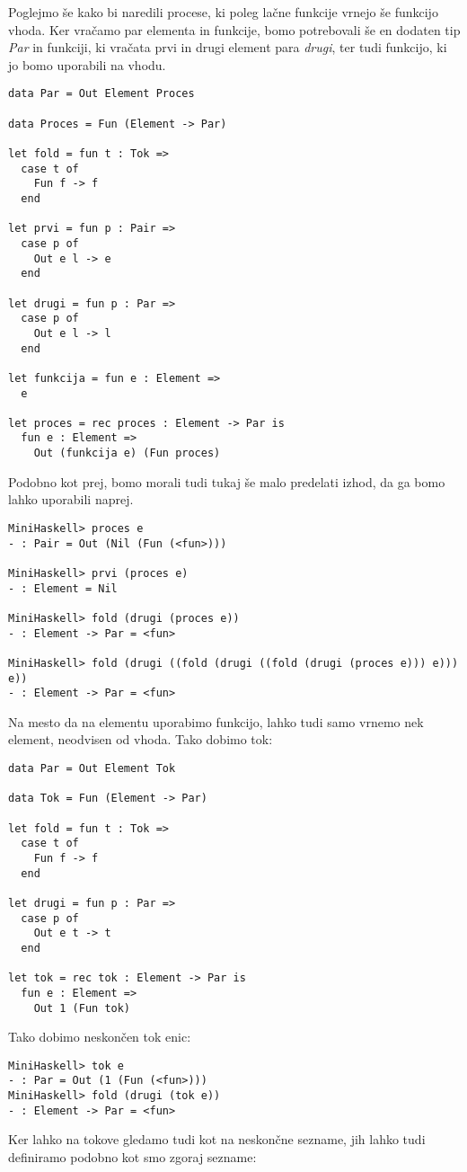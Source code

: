 \documentclass[12pt,a4paper,openany]{book}
\begin{document}
Poglejmo še kako bi naredili procese, ki poleg lačne funkcije vrnejo še funkcijo vhoda. Ker vračamo par elementa in funkcije, bomo potrebovali še 
en dodaten tip \emph{Par} in funkciji, ki vračata prvi in drugi element para \emph{drugi}, ter tudi funkcijo, ki jo bomo uporabili na vhodu. 
\begin{lstlisting}
data Par = Out Element Proces

data Proces = Fun (Element -> Par)

let fold = fun t : Tok =>
  case t of
    Fun f -> f
  end

let prvi = fun p : Pair =>
  case p of
    Out e l -> e
  end

let drugi = fun p : Par =>
  case p of
    Out e l -> l
  end

let funkcija = fun e : Element =>
  e

let proces = rec proces : Element -> Par is
  fun e : Element =>
    Out (funkcija e) (Fun proces)
\end{lstlisting}
Podobno kot prej, bomo morali tudi tukaj še malo predelati izhod, da ga bomo lahko uporabili naprej.
\begin{lstlisting}
MiniHaskell> proces e
- : Pair = Out (Nil (Fun (<fun>)))

MiniHaskell> prvi (proces e)
- : Element = Nil

MiniHaskell> fold (drugi (proces e))
- : Element -> Par = <fun>

MiniHaskell> fold (drugi ((fold (drugi ((fold (drugi (proces e))) e))) e))
- : Element -> Par = <fun>
\end{lstlisting}
Na mesto da na elementu uporabimo funkcijo, lahko tudi samo vrnemo nek element, neodvisen od vhoda. 
Tako dobimo tok:
\begin{lstlisting}
data Par = Out Element Tok

data Tok = Fun (Element -> Par)

let fold = fun t : Tok =>
  case t of
    Fun f -> f
  end

let drugi = fun p : Par =>
  case p of
    Out e t -> t
  end

let tok = rec tok : Element -> Par is
  fun e : Element =>
    Out 1 (Fun tok)
\end{lstlisting}
Tako dobimo neskončen tok enic:
\begin{lstlisting}
MiniHaskell> tok e
- : Par = Out (1 (Fun (<fun>)))
MiniHaskell> fold (drugi (tok e))
- : Element -> Par = <fun>
\end{lstlisting}
Ker lahko na tokove gledamo tudi kot na neskončne sezname, jih lahko tudi definiramo podobno kot smo zgoraj sezname:
\end{document}
